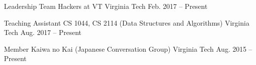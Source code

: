 

\begin{cvhonors}

  \cvhonor
    {Leadership Team} %
    {Hackers at VT} %
    {Virginia Tech} %
    {Feb. 2017 – Present} %

  \cvhonor
    {Teaching Assistant} %
    {CS 1044, CS 2114 (Data Structures and Algorithms)} %
    {Virginia Tech} %
    {Aug. 2017 – Present} %

  \cvhonor
    {Member} %
    {Kaiwa no Kai (Japanese Conversation Group)} %
    {Virginia Tech} %
    {Aug. 2015 – Present} %

\end{cvhonors}
